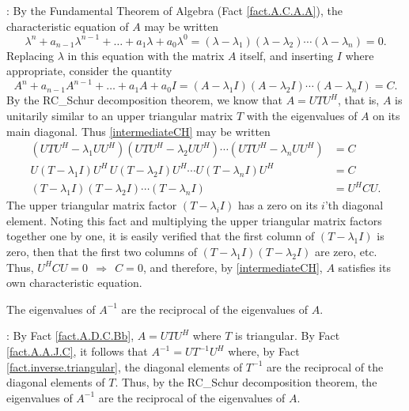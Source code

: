 \/: By the Fundamental Theorem of Algebra (Fact \ref{fact.A.C.A.A}), the characteristic equation of $A$ may be written
\begin{equation*}
    \lambda^{n}+a_{n-1}\lambda^{n-1}+\ldots + a_{1}\lambda +a_{0} \lambda^0=
    (\lambda - \lambda_{1})(\lambda-\lambda_{2})\cdots (\lambda-\lambda_{n})=0.
\end{equation*}
Replacing $\lambda$ in this equation with the matrix $A$ itself, and inserting $I$ where appropriate,
consider the quantity
\begin{equation}
    A^{n}+a_{n-1}A^{n-1}+\ldots + a_{1}A+a_{0} I =
    (A - \lambda_{1}I)(A -\lambda_{2}I)\cdots (A -\lambda_{n}I) = C.
    \label{intermediateCH}
\end{equation}
By the RC_Schur decomposition theorem, we know that $A=UTU^{H}$, that is,
$A$ is unitarily similar to an upper triangular matrix $T$ with the eigenvalues of $A$
on its main diagonal.  Thus \eqref{intermediateCH} may be written
\begin{align*}
    (UTU^{H} - \lambda_{1}UU^{H})(UTU^{H} -\lambda_{2}UU^{H})\cdots (UTU^{H} -\lambda_{n}UU^{H}) &= C \\
    U(T - \lambda_{1}I)U^{H}\,U(T -\lambda_{2}I)U^{H}\cdots U(T -\lambda_{n}I) U^{H} &= C \\
    (T - \lambda_{1}I) (T -\lambda_{2}I) \cdots (T -\lambda_{n}I)  &= U^{H} C U.
\end{align*}
The upper triangular matrix factor $(T-\lambda_{i}I)$ has a zero on its $i$'th diagonal
element.  Noting this fact and multiplying the upper triangular matrix factors together one by one, it is
easily verified that the first column of $(T - \lambda_{1}I)$ is zero, then that
the first two columns of $(T - \lambda_{1}I) (T -\lambda_{2}I)$ are
zero, etc.  Thus, $U^{H}CU=0\ \ \Rightarrow\ \ C=0$, and therefore, by
\eqref{intermediateCH}, $A$ satisfies its own characteristic equation.  \endproof 

\begin{fact} \label{fact.A.D.C.Bd} The eigenvalues of $A^{-1}$ are the reciprocal of the eigenvalues of $A$.
\end{fact}

\/: By Fact \ref{fact.A.D.C.Bb}, $A=UTU^{H}$ where $T$ is triangular.  By
Fact \ref{fact.A.A.J.C}, it follows that $A^{-1}=UT^{-1}U^{H}$ where, by Fact \ref{fact.inverse.triangular}, the
diagonal elements of $T^{-1}$ are the reciprocal of the diagonal
elements of $T$.  Thus, by the RC_Schur decomposition theorem, the eigenvalues of $A^{-1}$ are the
reciprocal of the eigenvalues of $A$. \endproof


